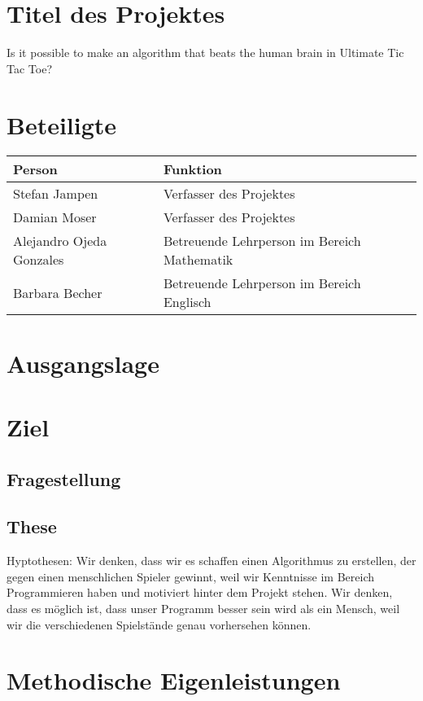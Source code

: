 \section{Titel des Projektes}
Is it possible to make an algorithm that beats the human brain in Ultimate Tic Tac Toe?

\section{Beteiligte}
\begin{tabularx}{\textwidth}{l|X}
\textbf{Person} & \textbf{Funktion} \\\hline
Stefan Jampen & Verfasser des Projektes \\
Damian Moser & Verfasser des Projektes \\
Alejandro Ojeda Gonzales & Betreuende Lehrperson im Bereich Mathematik \\
Barbara Becher & Betreuende Lehrperson im Bereich Englisch \\
\end{tabularx}

\section{Ausgangslage}

\section{Ziel}

\subsection{Fragestellung}

\subsection{These}
Hyptothesen:
Wir denken, dass wir es schaffen einen Algorithmus zu erstellen, der gegen einen menschlichen Spieler gewinnt, weil wir Kenntnisse im Bereich Programmieren haben und motiviert hinter dem Projekt stehen.
Wir denken, dass es möglich ist, dass unser Programm besser sein wird als ein Mensch, weil wir die verschiedenen Spielstände genau vorhersehen können.

\section{Methodische Eigenleistungen}

